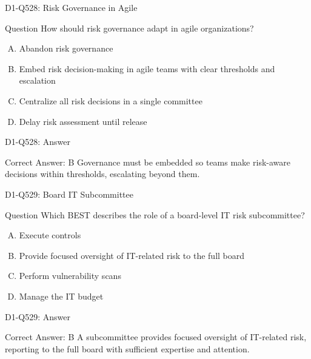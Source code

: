 \documentclass{beamer}
\begin{document}
\begin{frame}{D1-Q528: Risk Governance in Agile}
	\begin{block}{Question}
		How should risk governance adapt in agile organizations?
	\end{block}
	\begin{enumerate}[(A)]
		\item Abandon risk governance
		\item Embed risk decision-making in agile teams with clear thresholds and escalation
		\item Centralize all risk decisions in a single committee
		\item Delay risk assessment until release
	\end{enumerate}
\end{frame}
\begin{frame}{D1-Q528: Answer}
	\begin{block}{Correct Answer: B}
		Governance must be embedded so teams make risk-aware decisions within thresholds, escalating beyond them.
	\end{block}
\end{frame}

\begin{frame}{D1-Q529: Board IT Subcommittee}
	\begin{block}{Question}
		Which BEST describes the role of a board-level IT risk subcommittee?
	\end{block}
	\begin{enumerate}[(A)]
		\item Execute controls
		\item Provide focused oversight of IT-related risk to the full board
		\item Perform vulnerability scans
		\item Manage the IT budget
	\end{enumerate}
\end{frame}
\begin{frame}{D1-Q529: Answer}
	\begin{block}{Correct Answer: B}
		A subcommittee provides focused oversight of IT-related risk, reporting to the full board with sufficient expertise and attention.
	\end{block}
\end{frame}
\end{document}
